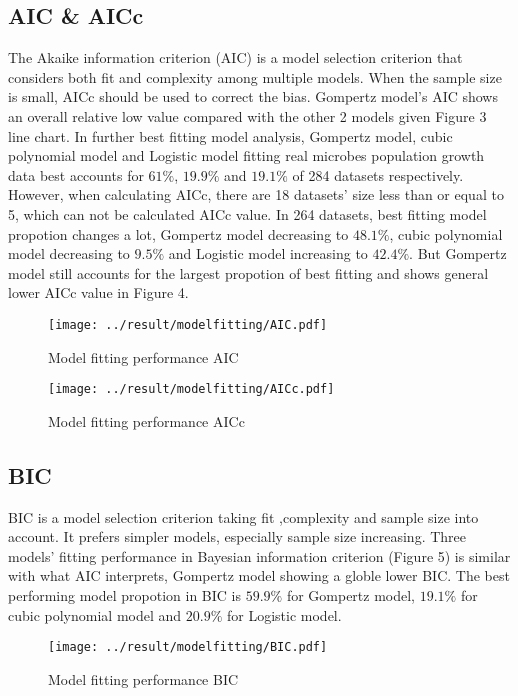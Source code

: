 \documentclass[11pt]{article}
\begin{document}
  \subsection{AIC \& AICc}
    The Akaike information criterion (AIC) is a model selection criterion that considers both fit and complexity 
    among multiple models. When the sample size is small, AICc should be used to correct the bias. Gompertz model's 
    AIC shows an overall relative low value compared with the other 2 models given Figure 3 line chart. In further 
    best fitting model analysis, Gompertz model, cubic polynomial model and Logistic model fitting real microbes population 
    growth data best accounts for $61\%$, $19.9\%$ and $19.1\%$ of 284 datasets respectively. However, when 
    calculating AICc, there are 18 datasets' size less than or equal to 5, which can not be calculated AICc value. 
    In 264 datasets, best fitting model propotion changes a lot, Gompertz model decreasing to $48.1\%$, cubic 
    polynomial model decreasing to $9.5\%$ and Logistic model increasing to $42.4\%$. But Gompertz model still 
    accounts for the largest propotion of best fitting and shows general lower AICc value in Figure 4.
    \begin{figure}
      \centering
      \texttt{[image: ../result/modelfitting/AIC.pdf]}
      \caption{Model fitting performance AIC}
    \end{figure}

    \begin{figure}
      \centering
      \texttt{[image: ../result/modelfitting/AICc.pdf]}
      \caption{Model fitting performance AICc}
    \end{figure}

  \subsection{BIC}
    BIC is a model selection criterion taking fit ,complexity and sample size into account. It prefers simpler 
    models, especially sample size increasing. Three models' fitting performance in Bayesian information 
    criterion (Figure 5) is similar with what AIC interprets, Gompertz model showing a globle lower BIC. The best 
    performing model propotion in BIC is $59.9\%$ for Gompertz model, $19.1\%$ for cubic polynomial model 
    and $20.9\%$ for Logistic model.
    \begin{figure}
      \centering
      \texttt{[image: ../result/modelfitting/BIC.pdf]}
      \caption{Model fitting performance BIC}
    \end{figure}
\end{document}
